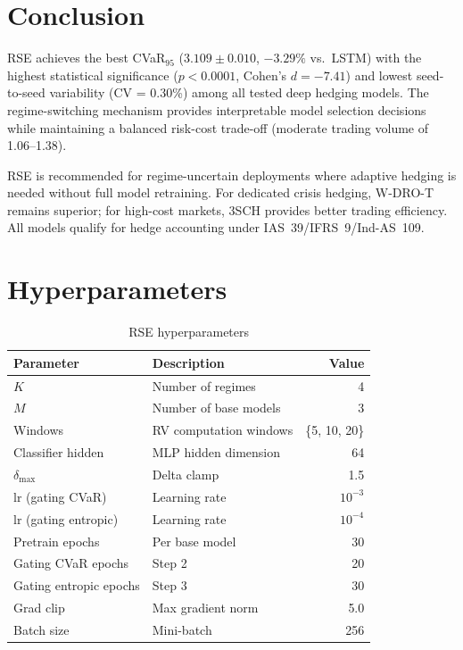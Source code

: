 \documentclass[11pt]{article}
\begin{document}
\section{Conclusion}

RSE achieves the best CVaR$_{95}$ ($3.109 \pm 0.010$, $-3.29\%$ vs.\ LSTM) with the highest statistical significance ($p < 0.0001$, Cohen's $d = -7.41$) and lowest seed-to-seed variability (CV = 0.30\%) among all tested deep hedging models. The regime-switching mechanism provides interpretable model selection decisions while maintaining a balanced risk-cost trade-off (moderate trading volume of 1.06--1.38).

RSE is recommended for regime-uncertain deployments where adaptive hedging is needed without full model retraining. For dedicated crisis hedging, W-DRO-T remains superior; for high-cost markets, 3SCH provides better trading efficiency. All models qualify for hedge accounting under IAS~39/IFRS~9/Ind-AS~109.




\appendix

\section{Hyperparameters}

\begin{table}[h]
\centering
\caption{RSE hyperparameters}
\small
\begin{tabular}{llr}
\toprule
\textbf{Parameter} & \textbf{Description} & \textbf{Value} \\
\midrule
$K$ & Number of regimes & 4 \\
$M$ & Number of base models & 3 \\
Windows & RV computation windows & \{5, 10, 20\} \\
Classifier hidden & MLP hidden dimension & 64 \\
$\delta_{\max}$ & Delta clamp & 1.5 \\
lr (gating CVaR) & Learning rate & $10^{-3}$ \\
lr (gating entropic) & Learning rate & $10^{-4}$ \\
Pretrain epochs & Per base model & 30 \\
Gating CVaR epochs & Step 2 & 20 \\
Gating entropic epochs & Step 3 & 30 \\
Grad clip & Max gradient norm & 5.0 \\
Batch size & Mini-batch & 256 \\
\bottomrule
\end{tabular}
\end{table}
\end{document}
